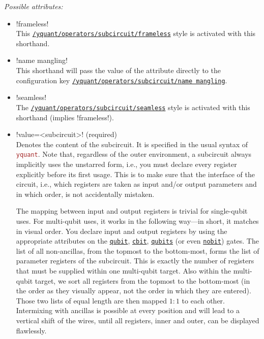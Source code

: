 \documentclass{scrartcl}
\def\pkg#1{\textcolor{brown}{\texttt{#1}}}
\def\gate#1{\hyperref[gate:#1]{\texttt{#1}}}
\def\style#1{\hyperref[style:#1]{\texttt{#1}}}
\def\Yquant{\pkg{yquant}}
\begin{document}
         \emph{Possible attributes:}
         \begin{itemize}
            \item {}\yquant!frameless! \\
               This \style{/yquant/operators/subcircuit/frameless} style is activated with this shorthand.
            \item {}\yquant!name mangling! \\
               This shorthand will pass the value of the attribute directly to the configuration key \style{/yquant/operators/subcircuit/name mangling}.
            \item {}\yquant!seamless! \\
               The \style{/yquant/operators/subcircuit/seamless} style is activated with this shorthand (implies \yquant!frameless!).
            \item \yquant!value=<subcircuit>! (required) \\
               Denotes the content of the subcircuit.
               It is specified in the usual syntax of \Yquant.
               Note that, regardless of the outer environment, a subcircuit always implicitly uses the unstarred form, i.e., you must declare every register explicitly before its first usage.
               This is to make sure that the interface of the circuit, i.e., which registers are taken as input and/or output parameters and in which order, is not accidentally mistaken.

               The mapping between input and output registers is trivial for single\hyp qubit uses.
               For multi\hyp qubit uses, it works in the following way---in short, it matches in visual order.
               You declare input and output registers by using the appropriate attributes on the \gate{qubit}, \gate{cbit}, \gate{qubits} (or even \gate{nobit}) gates.
               The list of all non\hyp ancillas, from the topmost to the bottom\hyp most, forms the list of parameter registers of the subcircuit.
               This is exactly the number of registers that must be supplied within one multi\hyp qubit target.
               Also within the multi\hyp qubit target, we sort all registers from the topmost to the bottom\hyp most (in the order as they visually appear, not the order in which they are entered).
               Those two lists of equal length are then mapped $1:1$ to each other.
               Intermixing with ancillas is possible at every position and will lead to a vertical shift of the wires, until all registers, inner and outer, can be displayed flawlessly.


\end{itemize}
\end{document}
